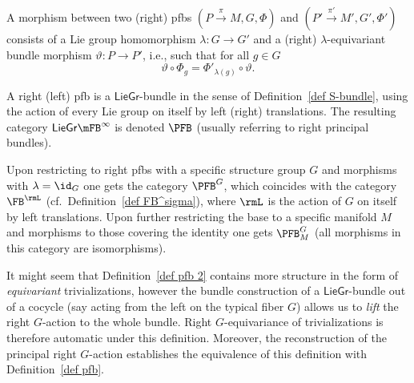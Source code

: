 \begin{defn}
    A morphism between two (right) \glspl{pfb} $(P\overset{\pi}{\to}M,G,\Phi)$ and $(P'\overset{\pi'}{\to}M',G',\Phi')$ consists of a Lie group homomorphism $\lambda:G\to G'$ and a (right) $\lambda$-equivariant bundle morphism $\vartheta:P\to P'$, i.e., such that for all $g\in G$
    \[\vartheta\circ \Phi_{g}=\Phi'_{\lambda(g)}\circ \vartheta.\]
\end{defn}

\begin{defn}\label{def pfb 3}
    A right (left) \gls{pfb} is a $\mathsf{LieGr}$-bundle in the sense of Definition~\ref{def S-bundle}, using the action of every Lie group on itself by left (right) translations. The resulting category $\mathsf{LieGr}\mFB^\infty$ is denoted $\PFB$ (usually referring to right principal bundles). 
    
    Upon restricting to right \glspl{pfb} with a specific structure group $G$ and morphisms with $\lambda=\id_G$ one gets the category $\PFB^G$, which coincides with the category $\FB^\rmL$ (cf.\ Definition~\ref{def FB^sigma}), where $\rmL$ is the action of $G$ on itself by left translations. Upon further restricting the base to a specific manifold $M$ and morphisms to those covering the identity one gets $\PFB^G_M$ (all morphisms in this category are isomorphisms).
\end{defn}

It might seem that Definition~\ref{def pfb 2} contains more structure in the form of \emph{equivariant} trivializations, however the bundle construction of a $\mathsf{LieGr}$-bundle out of a cocycle (say acting from the left on the typical fiber $G$) allows us to \emph{lift} the right $G$-action to the whole bundle. Right $G$-equivariance of trivializations is therefore automatic under this definition. Moreover, the reconstruction of the principal right $G$-action establishes the equivalence of this definition with Definition~\ref{def pfb}.

